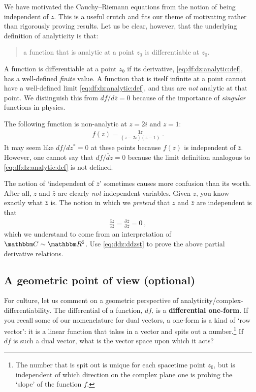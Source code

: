 We have motivated the Cauchy--Riemann equations from the notion of being independent of $\bar z$. This is a useful crutch and fits our theme of motivating rather than rigorously proving results. Let us be clear, however, that the underlying definition of analyticity is that:
\begin{quote}
a function that is analytic at a point $z_0$ is differentiable at $z_0$.
\end{quote}
A function is differentiable at a point $z_0$ if its derivative, \eqref{eq:df:dz:analytic:def}, has a well-defined \emph{finite} value. A function that is itself infinite at a point cannot have a well-defined limit \eqref{eq:df:dz:analytic:def}, and thus are \emph{not} analytic at that point.
We distinguish this from $df/d\bar z =0$ because of the importance of \emph{singular} functions in physics. 
\begin{example}
The following function is non-analytic at $z=2i$ and $z=1$:
\begin{align}
	f(z) = \frac{3z}{(z-2i)(z-1)} \ .
\end{align}
It may seem like $df/dz^* = 0$ at these points because $f(z)$ is independent of $\bar z$. However, one cannot say that $df/\bar dz=0$ because the limit definition analogous to \eqref{eq:df:dz:analytic:def} is not defined. 
\end{example}
\begin{exercise}
The notion of `independent of $\bar z$' sometimes causes more confusion than its worth. After all, $z$ and $\bar z$ are clearly \emph{not} independent variables. Given $z$, you know exactly what $\bar z$ is. The notion in which we \emph{pretend} that $z$ and $\bar z$ are independent is that
\begin{align}
	\frac{\partial z}{\partial \bar z} = 
	\frac{\partial \bar z}{\partial z} = 0 \ ,
\end{align}
which we understand to come from an interpretation of $\mathbbm C \sim \mathbbm R^2$. Use \eqref{eq:ddz:ddzst} to prove the above partial derivative relations.
\end{exercise}



\subsection{A geometric point of view (optional)}
\label{sec:analytic:geometric}

For culture, let us comment on a geometric perspective of analyticity/complex-differentiability. The differential of a function, $df$, is a \textbf{differential one-form}. If you recall some of our nomenclature for dual vectors, a one-form is a kind of `row vector': it is a linear function that takes in a vector and spits out a number.\footnote{The number that is spit out is unique for each spacetime point $z_0$, but is independent of which direction on the complex plane one is probing the `slope' of the function $f$.} If $df$ is such a dual vector, what is the vector space upon which it acts?

